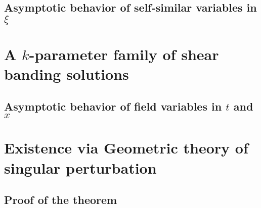 \documentclass[a4paper,11pt]{article}
\begin{document}

\subsection{Asymptotic behavior of self-similar variables in $\xi$}
\section{A $k$-parameter family of shear banding solutions}
\subsection{Asymptotic behavior of field variables in $t$ and $x$}
\section{Existence via Geometric theory of singular perturbation}
\subsection{Proof of the theorem} \label{sec:proof_proof} 
\end{document}
